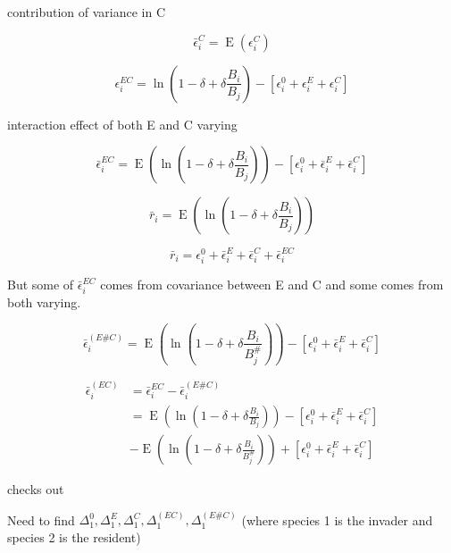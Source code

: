 \documentclass[letterpaper,11pt]{article}
\DeclareMathOperator{\EX}{E}%
\begin{document}
contribution of variance in C

\begin{equation}
\bar \epsilon_i^C=\EX(\epsilon_i^C) \label{Cvar_mean}
\end{equation}

\begin{equation}
\epsilon_i^{EC}=\ln(1-\delta + \delta \frac{B_i}{B_j}) -  [\epsilon_i^0 + \epsilon_i^E + \epsilon_i^C] \label{ECvar}
\end{equation}

interaction effect of both E and C varying

\begin{equation}
\bar \epsilon_i^{EC}=\EX(\ln(1-\delta + \delta \frac{B_i}{B_j})) -[\epsilon_i^0 +\bar \epsilon_i^E + \bar \epsilon_i^C] \label{ECvar_mean}
\end{equation}

\begin{equation}
\bar r_i=\EX(\ln(1-\delta + \delta \frac{B_i}{B_j}))\label{rbari}
\end{equation}

\begin{equation}
\bar r_i=\epsilon_i^0 +\bar \epsilon_i^E + \bar \epsilon_i^C + \bar \epsilon_i^{EC} \label{rbari_decomp}
\end{equation}

But some of $\bar \epsilon_i^{EC}$ comes from covariance between E and C and some comes from both varying.

\begin{equation}
\bar \epsilon_i^{(E\#C)}=\EX(\ln(1-\delta + \delta \frac{B_i}{B_j^{\#}})) -[\epsilon_i^0 +\bar \epsilon_i^E + \bar \epsilon_i^C] \label{ECvar_sharp}
\end{equation}

\begin{align}
\bar \epsilon_i^{(EC)}&=\bar \epsilon_i^{EC}-\bar \epsilon_i^{(E\#C)}\\
&= \EX(\ln(1-\delta + \delta \frac{B_i}{B_j}))-[\epsilon_i^0 +\bar \epsilon_i^E + \bar \epsilon_i^C]\\
&- \EX(\ln(1-\delta + \delta \frac{B_i}{B_j^{\#}})) +[\epsilon_i^0 +\bar \epsilon_i^E + \bar \epsilon_i^C]
\label{r_iSE}
\end{align}

checks out

Need to find $\Delta_1^0, \Delta_1^E, \Delta_1^C, \Delta_1^{(EC)}, \Delta_1^{(E\#C)}$ (where species 1 is the invader and species 2 is the resident)
\end{document}

